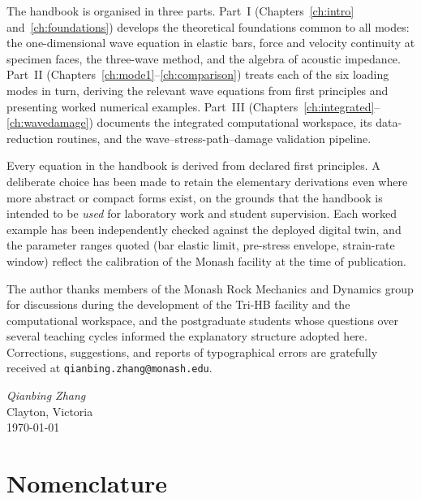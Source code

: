 \documentclass[11pt,a4paper,openany]{book}
\theoremstyle{handbook}
\begin{document}
The handbook is organised in three parts. Part~I (Chapters~\ref{ch:intro}
and~\ref{ch:foundations}) develops the theoretical foundations common to all
modes: the one-dimensional wave equation in elastic bars, force and velocity
continuity at specimen faces, the three-wave method, and the algebra of
acoustic impedance. Part~II (Chapters~\ref{ch:mode1}--\ref{ch:comparison})
treats each of the six loading modes in turn, deriving the relevant wave
equations from first principles and presenting worked numerical examples.
Part~III (Chapters~\ref{ch:integrated}--\ref{ch:wavedamage}) documents the
integrated computational workspace, its data-reduction routines, and the
wave--stress-path--damage validation pipeline.

Every equation in the handbook is derived from declared first principles. A
deliberate choice has been made to retain the elementary derivations even where
more abstract or compact forms exist, on the grounds that the handbook is
intended to be \emph{used} for laboratory work and student supervision. Each
worked example has been independently checked against the deployed digital
twin, and the parameter ranges quoted (bar elastic limit, pre-stress envelope,
strain-rate window) reflect the calibration of the Monash facility at the time
of publication.

The author thanks members of the Monash Rock Mechanics and Dynamics group for
discussions during the development of the Tri-HB facility and the
computational workspace, and the postgraduate students whose questions over
several teaching cycles informed the explanatory structure adopted here.
Corrections, suggestions, and reports of typographical errors are gratefully
received at \texttt{qianbing.zhang@monash.edu}.

\bigskip
\begin{flushright}
\textit{Qianbing Zhang}\\
Clayton, Victoria\\
\today
\end{flushright}

\cleardoublepage
{}
\tableofcontents

\cleardoublepage
\chapter*{Nomenclature}
\end{document}
